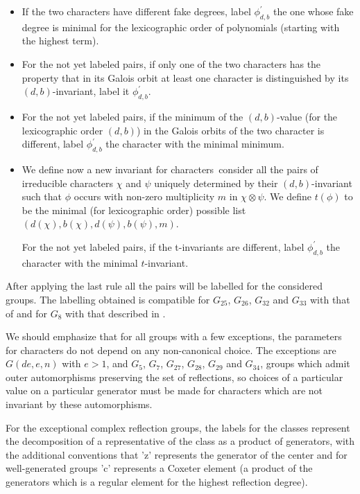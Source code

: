 \begin{itemize}
\item   If  the   two  characters   have  different   fake  degrees,  label
$\phi_{d,b}^\prime$   the  one  whose  fake   degree  is  minimal  for  the
lexicographic order of polynomials (starting with the highest term).

\item  For the not yet labeled pairs, if only one of the two characters has
the   property  that  in  its  Galois  orbit  at  least  one  character  is
distinguished by its $(d,b)$-invariant, label it $\phi_{d,b}^\prime$.

\item  For the not yet  labeled pairs, if the  minimum of the $(d,b)$-value
(for  the  lexicographic  order  $(d,b)$)  in  the Galois orbits of the two
character  is different,  label $\phi_{d,b}^\prime$  the character with the
minimal minimum.

\item
We  define now a new invariant for  characters\:\ consider all the pairs of
irreducible  characters  $\chi$  and  $\psi$  uniquely  determined by their
$(d,b)$-invariant such that $\phi$ occurs with non-zero multiplicity $m$ in
$\chi\otimes\psi$. We define $t(\phi)$ to be the minimal (for lexicographic
order) possible list $(d(\chi),b(\chi),d(\psi),b(\psi),m)$.

For the not yet labeled pairs, if  the t-invariants are different,
label $\phi_{d,b}^\prime$ the character with the minimal $t$-invariant.
\end{itemize}

After  applying  the  last  rule  all  the  pairs  will be labelled for the
considered  groups.  The  labelling  obtained  is  compatible for $G_{25}$,
$G_{26}$,  $G_{32}$ and  $G_{33}$ with  that of  \cite{Mal00} and for $G_8$
with that described in \cite{MR03}.

We  should  emphasize  that  for  all  groups  with  a  few exceptions, the
parameters  for characters do  not depend on  any non-canonical choice. The
exceptions   are  $G(de,e,n)$  with  $e>1$,  and  $G_5$,  $G_7$,  $G_{27}$,
$G_{28}$,  $G_{29}$ and  $G_{34}$, groups  which admit  outer automorphisms
preserving  the set of reflections,  so choices of a  particular value on a
particular generator must be made for characters which are not invariant by
these automorphisms.

  For  the  exceptional  complex
reflection  groups, the labels for  the classes represent the decomposition
of  a representative  of the  class as  a product  of generators,  with the
additional  conventions that 'z' represents the generator of the center and
for  well-generated groups 'c'  represents a Coxeter  element (a product of
the  generators  which  is  a  regular  element  for the highest reflection
degree).

